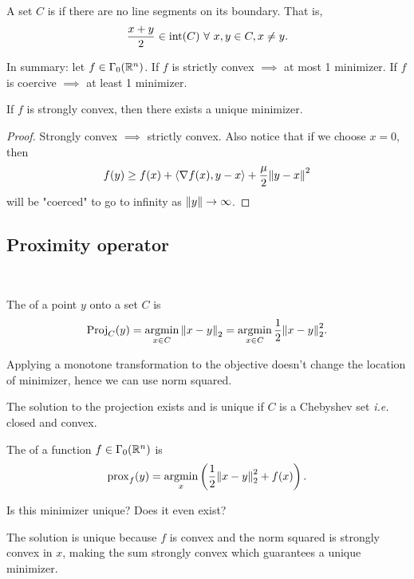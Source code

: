 \documentclass[class=article,crop=false]{standalone}
\begin{document}
\begin{defn}
A set $ C$ is   if there are no line segments on its boundary. That is,
\[
	\frac{x+y}{ 2} \in \operatorname{int} (C) \ \forall \ x,y \in C, x\neq y
.\] 
\end{defn}
\begin{remark}
	In summary: let $ f \in \Gamma_0(\mathbb{R}^{n})$. If $ f$ is strictly convex  $ \implies$ at most 1 minimizer. If $ f$ is coercive  $ \implies$ at least 1 minimizer.
\end{remark}
\begin{coro}
If $ f$ is strongly convex, then there exists a unique minimizer.
\end{coro}
\begin{proof}
Strongly convex $ \implies $ strictly convex. Also notice that if we choose $ x=0$, then
 \[
	 f(y)\geq f(x) + \langle \nabla f(x),y-x \rangle + \frac{\mu}{ 2} {\left\lVert{ y-x}\right\rVert}^2 
\]
will be "coerced" to go to infinity as $ {\left\lVert{ y}\right\rVert} \to \infty $.
\end{proof}

\subsection{Proximity operator}
~\begin{defn}
The  of a point $ y$ onto a set  $ C$ is
 \[
	 \operatorname{Proj}_C(y) = \operatorname*{argmin}_{x \in C} {\left\lVert{ x-y}\right\rVert}_2 = \operatorname*{argmin}_{x \in C} \frac{1}{2} {\left\lVert{ x-y}\right\rVert}_2^2  
.\]
\end{defn}
\begin{note}
Applying a monotone transformation to the objective doesn't change the location of minimizer, hence we can use norm squared.
\end{note}
\begin{remark}
The solution to the projection exists and is unique if $ C$ is a Chebyshev set  \emph{i.e.} closed and convex.
\end{remark}
\begin{defn}
	The  of a function $ f \in \Gamma_0 (\mathbb{R}^{n})$ is
	\[
		\operatorname{prox}_f (y) = \operatorname*{argmin}_x \left(\frac{1}{2} {\left\lVert{ x-y}\right\rVert}_2^2 + f(x) \right)
	.\] 
\end{defn}
\begin{ques}
Is this minimizer unique? Does it even exist?
\end{ques}

The solution is unique because $ f$ is convex and the norm squared is strongly convex in $ x$, making the sum strongly convex which guarantees a unique minimizer.
\end{document}
